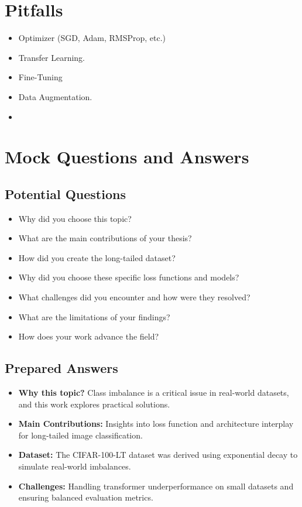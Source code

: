\documentclass[a4paper,12pt]{article}
\begin{document}
\section{Pitfalls}
\begin{itemize}
    \item Optimizer (SGD, Adam, RMSProp, etc.)
    \item Transfer Learning.
    \item Fine-Tuning
    \item Data Augmentation.
    \item 
\end{itemize}

\section{Mock Questions and Answers}
\subsection{Potential Questions}
\begin{itemize}
    \item Why did you choose this topic?
    \item What are the main contributions of your thesis?
    \item How did you create the long-tailed dataset?
    \item Why did you choose these specific loss functions and models?
    \item What challenges did you encounter and how were they resolved?
    \item What are the limitations of your findings?
    \item How does your work advance the field?
\end{itemize}

\subsection{Prepared Answers}
\begin{itemize}
    \item \textbf{Why this topic?} Class imbalance is a critical issue in real-world datasets, and this work explores practical solutions.
    \item \textbf{Main Contributions:} Insights into loss function and architecture interplay for long-tailed image classification.
    \item \textbf{Dataset:} The CIFAR-100-LT dataset was derived using exponential decay to simulate real-world imbalances.
    \item \textbf{Challenges:} Handling transformer underperformance on small datasets and ensuring balanced evaluation metrics.
\end{itemize}
\end{document}

